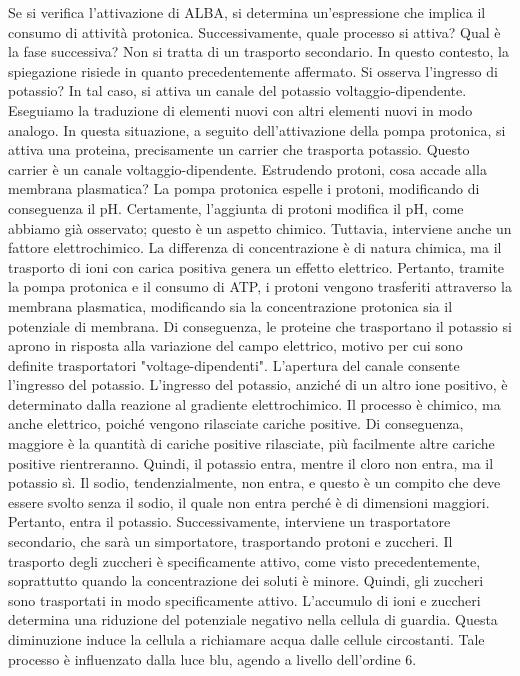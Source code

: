 \documentclass[11pt, a4paper]{article}
\begin{document}
\begin{spacing}{1}
Se si verifica l'attivazione di ALBA, si determina un'espressione che implica il consumo di attività protonica. Successivamente, quale processo si attiva? Qual è la fase successiva? Non si tratta di un trasporto secondario. In questo contesto, la spiegazione risiede in quanto precedentemente affermato. Si osserva l'ingresso di potassio? In tal caso, si attiva un canale del potassio voltaggio-dipendente.
Eseguiamo la traduzione di elementi nuovi con altri elementi nuovi in modo analogo. In questa situazione, a seguito dell'attivazione della pompa protonica, si attiva una proteina, precisamente un carrier che trasporta potassio. Questo carrier è un canale voltaggio-dipendente. Estrudendo protoni, cosa accade alla membrana plasmatica? La pompa protonica espelle i protoni, modificando di conseguenza il pH.
Certamente, l'aggiunta di protoni modifica il pH, come abbiamo già osservato; questo è un aspetto chimico. Tuttavia, interviene anche un fattore elettrochimico. La differenza di concentrazione è di natura chimica, ma il trasporto di ioni con carica positiva genera un effetto elettrico.
Pertanto, tramite la pompa protonica e il consumo di ATP, i protoni vengono trasferiti attraverso la membrana plasmatica, modificando sia la concentrazione protonica sia il potenziale di membrana. Di conseguenza, le proteine che trasportano il potassio si aprono in risposta alla variazione del campo elettrico, motivo per cui sono definite trasportatori "voltage-dipendenti". L'apertura del canale consente l'ingresso del potassio. L'ingresso del potassio, anziché di un altro ione positivo, è determinato dalla reazione al gradiente elettrochimico.
Il processo è chimico, ma anche elettrico, poiché vengono rilasciate cariche positive. Di conseguenza, maggiore è la quantità di cariche positive rilasciate, più facilmente altre cariche positive rientreranno. Quindi, il potassio entra, mentre il cloro non entra, ma il potassio sì. Il sodio, tendenzialmente, non entra, e questo è un compito che deve essere svolto senza il sodio, il quale non entra perché è di dimensioni maggiori. Pertanto, entra il potassio. Successivamente, interviene un trasportatore secondario, che sarà un simportatore, trasportando protoni e zuccheri. Il trasporto degli zuccheri è specificamente attivo, come visto precedentemente, soprattutto quando la concentrazione dei soluti è minore. Quindi, gli zuccheri sono trasportati in modo specificamente attivo.
L'accumulo di ioni e zuccheri determina una riduzione del potenziale negativo nella cellula di guardia. Questa diminuzione induce la cellula a richiamare acqua dalle cellule circostanti. Tale processo è influenzato dalla luce blu, agendo a livello dell'ordine 6.

\end{spacing}
\end{document}
